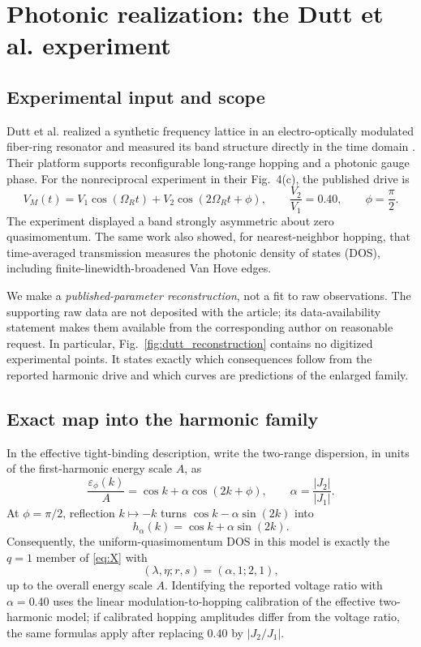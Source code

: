 \documentclass[11pt]{amsart}
\numberwithin{equation}{section}\setcounter{tocdepth}{3}\setcounter{secnumdepth}{3}
\begin{document}
\section{Photonic realization: the Dutt et al. experiment}
\label{sec:dutt}
\subsection{Experimental input and scope}\label{subsec:dutt_input}
Dutt et al. realized a synthetic frequency lattice in an electro-optically modulated
fiber-ring resonator and measured its band structure directly in the time domain
\cite{DuttEtAl2019}.  Their platform supports reconfigurable long-range hopping and a
photonic gauge phase.  For the nonreciprocal experiment in their Fig.~4(c), the published
drive is
\begin{equation}
 V_M(t)=V_1\cos(\Omega_Rt)+V_2\cos(2\Omega_Rt+\phi),\qquad
 \frac{V_2}{V_1}=0.40,\qquad \phi=\frac{\pi}{2}.
\label{eq:dutt_drive}
\end{equation}
The experiment displayed a band strongly asymmetric about zero quasimomentum.  The same
work also showed, for nearest-neighbor hopping, that time-averaged transmission measures
the photonic density of states (DOS), including finite-linewidth-broadened Van Hove edges.

We make a \emph{published-parameter reconstruction}, not a fit to raw observations.
The supporting raw data are not deposited with the article; its data-availability
statement makes them available from the corresponding author on reasonable request.
In particular, Fig.~\ref{fig:dutt_reconstruction} contains no digitized experimental
points.  It states exactly which consequences follow from the reported harmonic drive and
which curves are predictions of the enlarged family.

\subsection{Exact map into the harmonic family}\label{subsec:dutt_map}
In the effective tight-binding description, write the two-range dispersion, in units of
the first-harmonic energy scale $A$, as
\begin{equation}
 \frac{\varepsilon_\phi(k)}{A}
 =\cos k+\alpha\cos(2k+\phi),\qquad
 \alpha=\frac{|J_2|}{|J_1|}.
\label{eq:dutt_dispersion_general}
\end{equation}
At $\phi=\pi/2$, reflection $k\mapsto-k$ turns
$\cos k-\alpha\sin(2k)$ into
\begin{equation}
 h_\alpha(k)=\cos k+\alpha\sin(2k).
\label{eq:dutt_harmonic}
\end{equation}
Consequently, the uniform-quasimomentum DOS in this model is exactly the $q=1$ member of
\eqref{eq:X} with
\begin{equation}
 (\lambda,\eta;r,s)=(\alpha,1;2,1),
\label{eq:dutt_parameter_map}
\end{equation}
up to the overall energy scale $A$.  Identifying the reported voltage ratio with
$\alpha=0.40$ uses the linear modulation-to-hopping calibration of the effective
two-harmonic model; if calibrated hopping amplitudes differ from the voltage ratio, the
same formulas apply after replacing $0.40$ by $|J_2/J_1|$.
\end{document}
